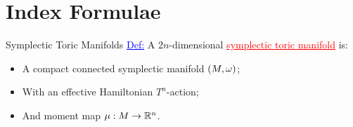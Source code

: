 \section{Index Formulae}

\begin{frame}{Symplectic Toric Manifolds}
    \textcolor{blue}{\underline{Def:}} A $2n$-dimensional \textcolor{red}{\underline{symplectic toric manifold}} is:
    \begin{itemize}
        \item A compact connected symplectic manifold $(M, \omega)$;
        \item With an effective Hamiltonian $T^{n}$-action;
        \item And moment map $\mu: M \rightarrow \mathbb{R}^{n}$.
    \end{itemize}
\end{frame}


